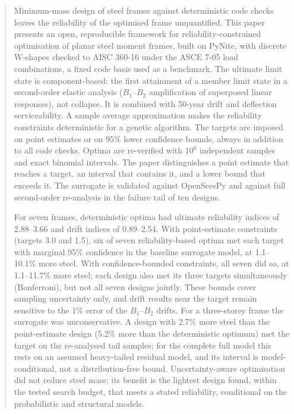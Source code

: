 \begin{abstract}
Minimum-mass design of steel frames against deterministic code checks leaves the reliability of the
optimised frame unquantified. This paper presents an open, reproducible framework for
reliability-constrained optimisation of planar steel moment frames, built on PyNite, with discrete
W-shapes checked to AISC 360-16 under the ASCE 7-05 load combinations, a fixed code basis used as a benchmark. The ultimate limit state is component-based: the first attainment of
a member limit state in a second-order elastic analysis ($B_1$--$B_2$ amplification of superposed
linear responses), not collapse. It is combined with 50-year drift and deflection serviceability.
A sample average approximation makes the reliability constraints deterministic for a genetic
algorithm. The targets are imposed on point estimates or on 95\% lower confidence bounds, always in
addition to all code checks. Optima are re-verified with $10^6$ independent samples and exact binomial
intervals. The paper distinguishes a point estimate that reaches a target, an interval that contains
it, and a lower bound that exceeds it. The surrogate is validated against OpenSeesPy and against full
second-order re-analysis in the failure tail of ten designs.

For seven frames, deterministic optima had ultimate reliability indices of 2.88--3.66 and drift indices
of 0.89--2.54. With point-estimate constraints (targets 3.0 and 1.5), six of seven reliability-based
optima met each target with marginal 95\% confidence in the baseline surrogate model, at
1.1--10.1\% more steel. With confidence-bounded constraints, all seven did so, at 1.1--11.7\% more
steel; each design also met its three targets simultaneously (Bonferroni), but not all seven
designs jointly. These bounds
cover sampling uncertainty only, and drift results near the target remain sensitive to the 1\% error
of the $B_1$--$B_2$ drifts. For a three-storey frame the surrogate was unconservative. A design with
2.7\% more steel than the point-estimate design (5.2\% more than the deterministic optimum) met the
target on the re-analysed tail samples; for the complete full model this rests on an assumed
heavy-tailed residual model, and its interval is model-conditional, not a distribution-free bound. Uncertainty-aware
optimisation did not reduce steel mass; its benefit is the lightest design found, within the tested search budget, that meets a stated
reliability, conditional on the probabilistic and structural models.
\end{abstract}
